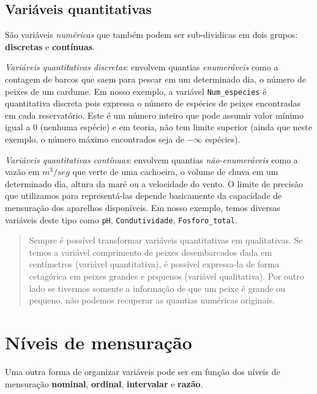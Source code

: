 \documentclass[
]{book}
\begin{document}
\hypertarget{variuxe1veis-quantitativas}{%
\subsection{Variáveis quantitativas}\label{variuxe1veis-quantitativas}}

São variáveis \emph{numéricas} que também podem ser sub-dividicas em dois grupos: \textbf{discretas} e \textbf{contínuas}.

\emph{Variáveis quantitativas discretas}: envolvem quantias \emph{enumeráveis} como a contagem de barcos que saem para pescar em um determinado dia, o número de peixes de um cardume. Em nosso exemplo, a variável \texttt{Num\_especies} é quantitativa discreta pois expressa o número de espécies de peixes encontradas em cada reservatório. Este é um número inteiro que pode assumir valor mínimo igual a 0 (nenhuma espécie) e em teoria, não tem limite superior (ainda que neste exemplo, o número máximo encontrados seja de \ensuremath{-\infty{}} espécies).

\emph{Variáveis quantitativas contínuas}: envolvem quantias \emph{não-enumeráveis} como a vazão em \(m^3/seg\) que verte de uma cachoeira, o volume de chuva em um determinado dia, altura da maré ou a velocidade do vento. O limite de precisão que utilizamos para representá-las depende basicamente da capacidade de mensuração dos aparelhos disponíveis. Em nosso exemplo, temos diversas variáveis deste tipo como \texttt{pH}, \texttt{Condutividade}, \texttt{Fosforo\_total}.

\begin{quote}
Sempre é possível transformar variáveis quantitativas em qualitativas. Se temos a variável comprimento de peixes desembarcados dada em centímetros (variável quantitativa), é possível expressa-la de forma cetagórica em peixes grandes e pequenos (variável qualitativa). Por outro lado se tivermos somente a informação de que um peixe é grande ou pequeno, não podemos recuperar as quantias numéricas originais.
\end{quote}

\hypertarget{nuxedveis-de-mensurauxe7uxe3o}{%
\section{Níveis de mensuração}\label{nuxedveis-de-mensurauxe7uxe3o}}

Uma outra forma de organizar variáveis pode ser em função dos níveis de mensuração \textbf{nominal}, \textbf{ordinal}, \textbf{intervalar} e \textbf{razão}.
\end{document}
